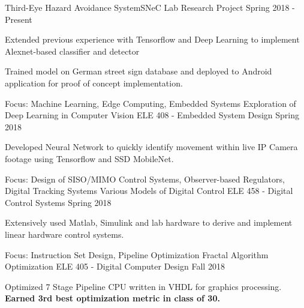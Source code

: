 \graduateheader
\begin{cvprojectentries}
  {Third-Eye Hazard Avoidance System}{SNeC Lab Research Project}
  {Spring 2018 - Present}
  {
    \begin{cvitems}
        \item{Extended previous experience with Tensorflow and Deep Learning to implement Alexnet-based classifier and detector}
        \item{Trained model on German street sign database and deployed to Android application for proof of concept implementation.}
    \end{cvitems}
  }
\end{cvprojectentries}
\ugradheader
\begin{cvprojectentries}
  \cvprojectentry
    {Focus: Machine Learning, Edge Computing, Embedded Systems}
    {Exploration of Deep Learning in Computer Vision}
    {ELE 408 - Embedded System Design}
    {Spring 2018}
    {
      \begin{cvitems}
        \item{Developed Neural Network to quickly identify movement within live IP Camera footage using Tensorflow and SSD MobileNet.}
      \end{cvitems}
    }
  \cvprojectentry
    {Focus: Design of SISO/MIMO Control Systems, Observer-based Regulators, Digital Tracking Systems}
    {Various Models of Digital Control}
    {ELE 458 - Digital Control Systems}
    {Spring 2018}
    {
      \begin{cvitems}
        \item {Extensively used Matlab, Simulink and lab hardware to derive and implement linear hardware control systems.}
      \end{cvitems}
    }
  \cvprojectentry
    {Focus: Instruction Set Design, Pipeline Optimization}
    {Fractal Algorithm Optimization}
    {ELE 405 - Digital Computer Design}
    {Fall 2018}
    {
      \begin{cvitems}
        \item {Optimized 7 Stage Pipeline CPU written in VHDL for graphics processing. \textbf{Earned 3rd best optimization metric in class of 30.}}
      \end{cvitems}
    }
\end{cvprojectentries}

